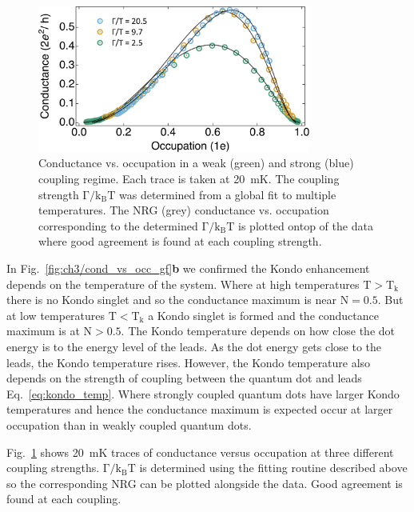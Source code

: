 \begin{figure}[!bht]
  \begin{center}
    \includegraphics[width=0.8\textwidth]{figures/ch3/crop_FiguresMaster.015.png}
    \caption[Conductance vs. Occupation : Varying the coupling strength between the quantum dot and leads]{\label{fig:ch3/cond_occ_couplingstrength} 
    Conductance vs. occupation in a weak (green) and strong (blue) coupling regime. Each trace is taken at \qty{20}{mK}. The coupling strength $\mathrm{\Gamma/k_BT}$ was determined from a global fit to multiple temperatures. The NRG (grey) conductance vs. occupation corresponding to the determined $\mathrm{\Gamma/k_BT}$ is plotted ontop of the data where good agreement is found at each coupling strength.}
  \end{center}
\end{figure}


In Fig.~\ref{fig:ch3/cond_vs_occ_gf}\textbf{b} we confirmed the Kondo enhancement depends on the temperature of the system. Where at high temperatures $\mathrm{T>T_k}$ there is no Kondo singlet and so the conductance maximum is near $\mathrm{N} = 0.5$. But at low temperatures $\mathrm{T<T_k}$ a Kondo singlet is formed and the conductance maximum is at $\mathrm{N} > 0.5$. The Kondo temperature depends on how close the dot energy is to the energy level of the leads. As the dot energy gets close to the leads, the Kondo temperature rises. However, the Kondo temperature also depends on the strength of coupling between the quantum dot and leads Eq.~\ref{eq:kondo_temp}. Where strongly coupled quantum dots have larger Kondo temperatures and hence the conductance maximum is expected occur at larger occupation than in weakly coupled quantum dots.  

Fig.~\ref{fig:ch3/cond_occ_couplingstrength} shows \qty{20}{mK} traces of conductance versus occupation at three different coupling strengths. $\mathrm{\Gamma/k_BT}$ is determined using the fitting routine described above so the corresponding NRG can be plotted alongside the data. Good agreement is found at each coupling. 







